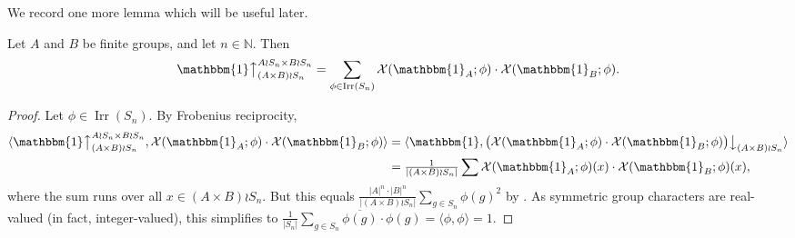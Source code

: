 \documentclass[ALCO, Unicode]{cedram}
\newcommand{\triv}{\mathbbm{1}}
\newcommand{\Irr}{\operatorname{Irr}}
\newcommand{\down}{\big\downarrow}
\newcommand{\up}{\big\uparrow}
\newcommand{\cX}{\mathcal{X}}
\newcommand{\N}{\mathbb{N}}
\begin{document}
We record one more lemma which will be useful later.
\begin{lemma}\label{lem:X-induced}
	Let $A$ and $B$ be finite groups, and let $n\in\N$. Then
	\[ \triv\up_{(A\times B)\wr S_n}^{A\wr S_n \times B\wr S_n} = \sum_{\phi\in\Irr(S_n)} \cX(\triv_A;\phi)\cdot\cX(\triv_B;\phi). \]
\end{lemma}
\begin{proof}
	Let $\phi\in\Irr(S_n)$. By Frobenius reciprocity, 
	\begin{align*}
		\langle \triv\up_{(A\times B)\wr S_n}^{A\wr S_n \times B\wr S_n}, \cX(\triv_A;\phi)\cdot\cX(\triv_B;\phi)\rangle &= \langle \triv, \big( \cX(\triv_A;\phi)\cdot\cX(\triv_B;\phi) \big) \down_{(A\times B)\wr S_n}\rangle\\
		&= \tfrac{1}{|(A\times B)\wr S_n|}\sum \cX(\triv_A;\phi)(x)\cdot\cX(\triv_B;\phi)(x),
	\end{align*}
where the sum runs over all $x\in (A\times B)\wr S_n$.
	But this equals $\tfrac{|A|^n\cdot|B|^n}{|(A\times B)\wr S_n|}\sum_{g\in S_n} \phi(g)^2$ by \cite[Lemma 4.3.9]{JK}. As symmetric group characters are real-valued (in fact, integer-valued), this simplifies to $\tfrac{1}{|S_n|}\sum_{g\in S_n}\overline{\phi(g)}\cdot\phi(g)=\langle \phi,\phi\rangle=1$.
\end{proof}
\end{document}
